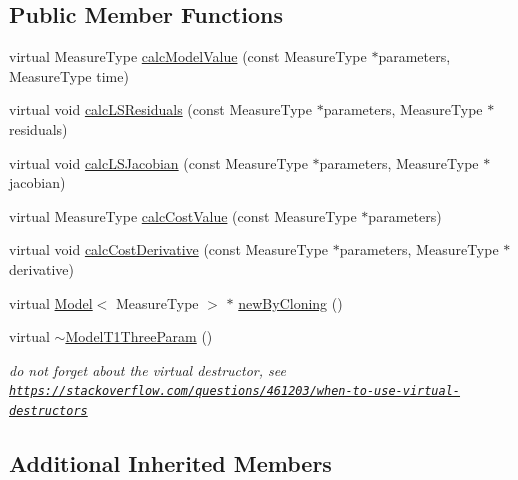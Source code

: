 \subsection*{Public Member Functions}
\begin{DoxyCompactItemize}
\item 
virtual Measure\+Type \hyperlink{class_ox_1_1_model_t1_three_param_a4b2e40499a77399cc3dd74fbe9a02aee}{calc\+Model\+Value} (const Measure\+Type $\ast$parameters, Measure\+Type time)
\item 
virtual void \hyperlink{class_ox_1_1_model_t1_three_param_abef151c12e9b7d49e23955dd1ae9c992}{calc\+L\+S\+Residuals} (const Measure\+Type $\ast$parameters, Measure\+Type $\ast$residuals)
\item 
virtual void \hyperlink{class_ox_1_1_model_t1_three_param_a2b6268cb77c6a9d95c7861641cd3a2d5}{calc\+L\+S\+Jacobian} (const Measure\+Type $\ast$parameters, Measure\+Type $\ast$jacobian)
\item 
virtual Measure\+Type \hyperlink{class_ox_1_1_model_t1_three_param_ad417e4455caae28f1364f82b5f8f37d5}{calc\+Cost\+Value} (const Measure\+Type $\ast$parameters)
\item 
virtual void \hyperlink{class_ox_1_1_model_t1_three_param_a7bd09162c315aa491af661cf8d88bcdd}{calc\+Cost\+Derivative} (const Measure\+Type $\ast$parameters, Measure\+Type $\ast$derivative)
\item 
virtual \hyperlink{class_ox_1_1_model}{Model}$<$ Measure\+Type $>$ $\ast$ \hyperlink{class_ox_1_1_model_t1_three_param_afc6ffe41934c513e12a45cc5821fddca}{new\+By\+Cloning} ()
\item 
virtual \hyperlink{class_ox_1_1_model_t1_three_param_a533739a9eda1cb9d006e292bae466082}{$\sim$\+Model\+T1\+Three\+Param} ()\hypertarget{class_ox_1_1_model_t1_three_param_a533739a9eda1cb9d006e292bae466082}{}\label{class_ox_1_1_model_t1_three_param_a533739a9eda1cb9d006e292bae466082}

\begin{DoxyCompactList}\small\item\em do not forget about the virtual destructor, see \href{https://stackoverflow.com/questions/461203/when-to-use-virtual-destructors}{\tt https\+://stackoverflow.\+com/questions/461203/when-\/to-\/use-\/virtual-\/destructors} \end{DoxyCompactList}\end{DoxyCompactItemize}
\subsection*{Additional Inherited Members}


